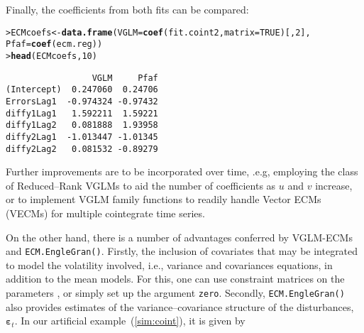 \documentclass[a4paper, 11pt]{article}\usepackage[]{graphicx}\usepackage[]{color}
\makeatletter
\newcommand{\hlnum}[1]{\textcolor[rgb]{0.686,0.059,0.569}{#1}}%
\newcommand{\hlstd}[1]{\textcolor[rgb]{0.345,0.345,0.345}{#1}}%
\newcommand{\hlkwb}[1]{\textcolor[rgb]{0.69,0.353,0.396}{#1}}%
\newcommand{\hlkwc}[1]{\textcolor[rgb]{0.333,0.667,0.333}{#1}}%
\newcommand{\hlkwd}[1]{\textcolor[rgb]{0.737,0.353,0.396}{\textbf{#1}}}%
\newenvironment{kframe}{%
 \def\at@end@of@kframe{}%
 \ifinner\ifhmode%
  \def\at@end@of@kframe{\end{minipage}}%
  \begin{minipage}{\columnwidth}%
 \fi\fi%
 \def\FrameCommand##1{\hskip\@totalleftmargin \hskip-\fboxsep
 \colorbox{shadecolor}{##1}\hskip-\fboxsep
     \hskip-\linewidth \hskip-\@totalleftmargin \hskip\columnwidth}%
 \MakeFramed {\advance\hsize-\width
   \@totalleftmargin\z@ \linewidth\hsize
   \@setminipage}}%
 {\par\unskip\endMakeFramed%
 \at@end@of@kframe}
\newenvironment{knitrout}{}{} %
\makeatother
\begin{document}
Finally, the coefficients from both fits can be compared:

\begin{knitrout}\scriptsize
{}\color{fgcolor}\begin{kframe}
\begin{alltt}
\hlstd{> }\hlstd{ECMcoefs} \hlkwb{<-} \hlkwd{data.frame}\hlstd{(}\hlkwc{VGLM} \hlstd{=} \hlkwd{coef}\hlstd{(fit.coint2,} \hlkwc{matrix} \hlstd{=} \hlnum{TRUE}\hlstd{)[,} \hlnum{2}\hlstd{],}
\hlstd{  }                       \hlkwc{Pfaf} \hlstd{=} \hlkwd{coef}\hlstd{(ecm.reg))}
\hlstd{> }\hlkwd{head}\hlstd{(ECMcoefs,} \hlnum{10}\hlstd{)}
\end{alltt}
\begin{verbatim}
                 VGLM     Pfaf
(Intercept)  0.247060  0.24706
ErrorsLag1  -0.974324 -0.97432
diffy1Lag1   1.592211  1.59221
diffy1Lag2   0.081888  1.93958
diffy2Lag1  -1.013447 -1.01345
diffy2Lag2   0.081532 -0.89279
\end{verbatim}
\end{kframe}
\end{knitrout}



\vspace{2mm}
Further improvements are to be incorporated over time, .e.g,
employing the class of Reduced--Rank VGLMs
\citep[RR--VGLMs]{yee:2015}
to aid the number of coefficients as $u$ and $v$ increase,
or to implement VGLM family functions to readily handle
Vector ECMs (VECMs) for multiple cointegrate time series.

\vspace{2mm}
On the other hand, there is a number of advantages conferred
by VGLM-ECMs and {\color{blue} \texttt{ECM.EngleGran()}}.
Firstly, the inclusion of covariates that may be integrated to 
model the volatility involved, i.e.,
variance and covariances equations, in addition to the mean
models. For this, one can use constraint matrices on the
parameters \cite{yee:2015}, or simply set up the argument
{\color{blue} \texttt{zero}}. 
Secondly, {\color{blue} \texttt{ECM.EngleGran()}} also 
provides estimates of the variance--covariance structure of
the disturbances, $\boldsymbol{\varepsilon}_t$. 
In our artificial example~(\ref{sim:coint}), it is given by
\end{document}
